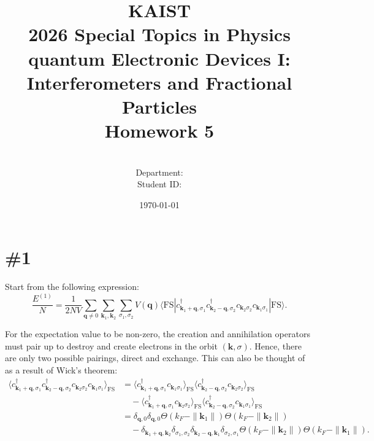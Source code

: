 \documentclass[a4paper,11pt]{article}
\title{KAIST\\2026 Special Topics in Physics quantum Electronic Devices I: Interferometers and Fractional Particles\\
Homework 5\bigskip}
\author{\textbf{\Large \name} \\
Department: \department\\
Student ID: \studentid}
\date{\today}
\begin{document}
\thispagestyle{empty}
\maketitle
\tableofcontents
{}
\setcounter{secnumdepth}{1}
\setcounter{tocdepth}{2}

\newcommand{\tr}{\operatorname{tr}}
\newcommand{\sgn}{\operatorname{sgn}}
\newcommand{\supp}{\operatorname{supp}}
\renewcommand{\Re}{\operatorname{Re}}
\renewcommand{\Im}{\operatorname{Im}}
\newcommand{\boltz}{k_{\mathrm{B}}}

\section{\#1}

Start from the following expression:
\begin{equation}
  \frac{E^{(1)}}{N} = \frac{1}{2NV}\sum_{\mathbf{q}\ne 0}\sum_{\mathbf{k}_1, \mathbf{k}_2}\sum_{\sigma_1, \sigma_2} V(\mathbf{q}) \langle \text{FS} | c_{\mathbf{k}_1+\mathbf{q}, \sigma_1}^\dagger c_{\mathbf{k}_2 - \mathbf{q}, \sigma_2}^\dagger c_{\mathbf{k}_2 \sigma_2} c_{\mathbf{k}_1 \sigma_1} | \text{FS} \rangle.
\end{equation}

For the expectation value to be non-zero, the creation and annihilation operators must pair up to destroy and create electrons in the orbit $(\mathbf{k}, \sigma)$. Hence, there are only two possible pairings, direct and exchange. This can also be thought of as a result of Wick's theorem:
\begin{align}
  \langle c_{\mathbf{k}_1+\mathbf{q}, \sigma_1}^\dagger c_{\mathbf{k}_2 - \mathbf{q}, \sigma_2}^\dagger c_{\mathbf{k}_2 \sigma_2} c_{\mathbf{k}_1 \sigma_1} \rangle_{\text{FS}} 
  &= \langle c_{\mathbf{k}_1+\mathbf{q}, \sigma_1}^\dagger c_{\mathbf{k}_1 \sigma_1} \rangle_{\text{FS}} \langle c_{\mathbf{k}_2 - \mathbf{q}, \sigma_2}^\dagger c_{\mathbf{k}_2 \sigma_2} \rangle_{\text{FS}} \nonumber\\
  &\quad - \langle c_{\mathbf{k}_1+\mathbf{q}, \sigma_1}^\dagger c_{\mathbf{k}_2 \sigma_2} \rangle_{\text{FS}} \langle c_{\mathbf{k}_2 - \mathbf{q}, \sigma_2}^\dagger c_{\mathbf{k}_1 \sigma_1} \rangle_{\text{FS}}\\
  &= \delta_{\mathbf{q}, 0} \delta_{\mathbf{q}, 0} \Theta(k_F - \|\mathbf{k}_1\|) \Theta(k_F - \|\mathbf{k}_2\|) \nonumber\\
  &\quad - \delta_{\mathbf{k}_1 + \mathbf{q}, \mathbf{k}_2}\delta_{\sigma_1, \sigma_2} \delta_{\mathbf{k}_2-\mathbf{q}, \mathbf{k}_1}\delta_{\sigma_2, \sigma_1} \Theta(k_F - \|\mathbf{k}_2\|) \Theta(k_F - \|\mathbf{k}_1\|).
\end{align}
\end{document}

